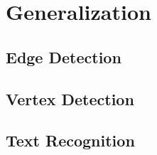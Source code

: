 \chapter{Generalization}

\section{Edge Detection}

\section{Vertex Detection}

\section{Text Recognition}
